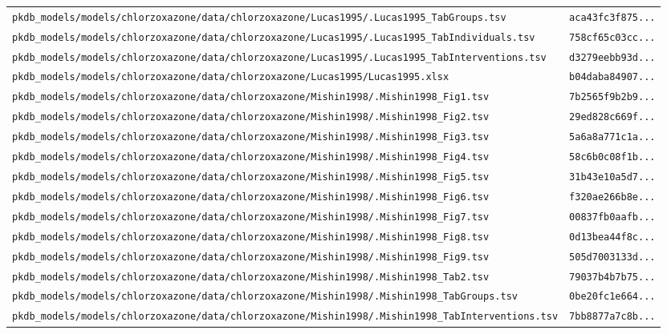 \begin{longtable}{ll}
\texttt{pkdb\_models/models/chlorzoxazone/data/chlorzoxazone/Lucas1995/.Lucas1995\_TabGroups.tsv} & \texttt{aca43fc3f875...} \\
\texttt{pkdb\_models/models/chlorzoxazone/data/chlorzoxazone/Lucas1995/.Lucas1995\_TabIndividuals.tsv} & \texttt{758cf65c03cc...} \\
\texttt{pkdb\_models/models/chlorzoxazone/data/chlorzoxazone/Lucas1995/.Lucas1995\_TabInterventions.tsv} & \texttt{d3279eebb93d...} \\
\texttt{pkdb\_models/models/chlorzoxazone/data/chlorzoxazone/Lucas1995/Lucas1995.xlsx} & \texttt{b04daba84907...} \\
\texttt{pkdb\_models/models/chlorzoxazone/data/chlorzoxazone/Mishin1998/.Mishin1998\_Fig1.tsv} & \texttt{7b2565f9b2b9...} \\
\texttt{pkdb\_models/models/chlorzoxazone/data/chlorzoxazone/Mishin1998/.Mishin1998\_Fig2.tsv} & \texttt{29ed828c669f...} \\
\texttt{pkdb\_models/models/chlorzoxazone/data/chlorzoxazone/Mishin1998/.Mishin1998\_Fig3.tsv} & \texttt{5a6a8a771c1a...} \\
\texttt{pkdb\_models/models/chlorzoxazone/data/chlorzoxazone/Mishin1998/.Mishin1998\_Fig4.tsv} & \texttt{58c6b0c08f1b...} \\
\texttt{pkdb\_models/models/chlorzoxazone/data/chlorzoxazone/Mishin1998/.Mishin1998\_Fig5.tsv} & \texttt{31b43e10a5d7...} \\
\texttt{pkdb\_models/models/chlorzoxazone/data/chlorzoxazone/Mishin1998/.Mishin1998\_Fig6.tsv} & \texttt{f320ae266b8e...} \\
\texttt{pkdb\_models/models/chlorzoxazone/data/chlorzoxazone/Mishin1998/.Mishin1998\_Fig7.tsv} & \texttt{00837fb0aafb...} \\
\texttt{pkdb\_models/models/chlorzoxazone/data/chlorzoxazone/Mishin1998/.Mishin1998\_Fig8.tsv} & \texttt{0d13bea44f8c...} \\
\texttt{pkdb\_models/models/chlorzoxazone/data/chlorzoxazone/Mishin1998/.Mishin1998\_Fig9.tsv} & \texttt{505d7003133d...} \\
\texttt{pkdb\_models/models/chlorzoxazone/data/chlorzoxazone/Mishin1998/.Mishin1998\_Tab2.tsv} & \texttt{79037b4b7b75...} \\
\texttt{pkdb\_models/models/chlorzoxazone/data/chlorzoxazone/Mishin1998/.Mishin1998\_TabGroups.tsv} & \texttt{0be20fc1e664...} \\
\texttt{pkdb\_models/models/chlorzoxazone/data/chlorzoxazone/Mishin1998/.Mishin1998\_TabInterventions.tsv} & \texttt{7bb8877a7c8b...} \\

\end{longtable}

